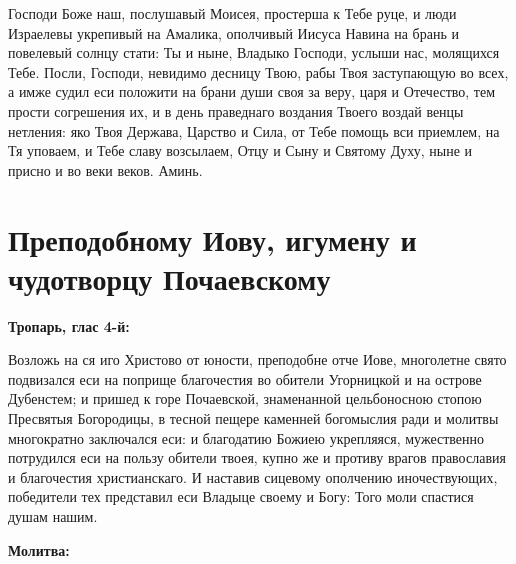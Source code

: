 Господи Боже наш, послушавый Моисея, простерша к Тебе руце, и люди Израелевы укрепивый на Амалика, ополчивый Иисуса Навина на брань и повелевый солнцу стати: Ты и ныне, Владыко Господи, услыши нас, молящихся Тебе. Посли, Господи, невидимо десницу Твою, рабы Твоя заступающую во всех, а имже судил еси положити на брани души своя за веру,  царя и Отечество, тем прости согрешения их, и в день праведнаго воздания Твоего воздай венцы нетления: яко Твоя Держава, Царство и Сила, от Тебе помощь вси приемлем, на Тя уповаем, и Тебе славу возсылаем, Отцу и Сыну и Святому Духу, ныне и присно и во веки веков. Аминь.


\section{Преподобному Иову, игумену и чудотворцу Почаевскому}
 

\bfseries Тропарь, глас 4-й:\normalfont{}\nopagebreak


Возложь на ся иго Христово от юности, преподобне отче Иове, многолетне свято подвизался еси на поприще благочестия во обители Угорницкой и на острове Дубенстем; и пришед к горе Почаевской, знаменанной цельбоносною стопою Пресвятыя Богородицы, в тесной пещере каменней богомыслия ради и молитвы многократно заключался еси: и благодатию Божиею укрепляяся, мужественно потрудился еси на пользу обители твоея, купно же и противу врагов православия и благочестия христианскаго. И наставив сицевому ополчению иночествующих, победители тех представил еси Владыце своему и Богу: Того моли спастися душам нашим.


\medskip


\bfseries Молитва:\normalfont{}\nopagebreak


